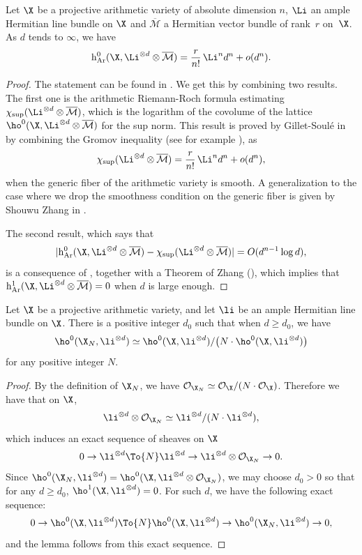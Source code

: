 \begin{thm}\label{hilbsamu}
Let $\X$ be a projective arithmetic variety of absolute dimension $n$, $\Li$ an ample Hermitian line bundle on $\X$ and $\overline{\mathcal{M}}$ a Hermitian vector bundle of rank~$r$ on~$\X$. As $d$ tends to $\infty$, we have
\[
\mathrm{h}^0_{\mathrm{Ar}}(\X,\Li^{\otimes d}\otimes \overline{\mathcal{M}})= \frac{r}{n!}\,\Li^{n} d^n+o(d^n).
\]
\end{thm}
\begin{proof}[Proof]
The statement can be found in \cite[Cor.\,2.7 (1)]{Yu08}. We get this by combining two results. The first one is the arithmetic Riemann-Roch formula esti\-ma\-ting $\chi_{\mathrm{sup}}(\Li^{\otimes d}\otimes \overline{\mathcal{M}})$, which is the logarithm of the covolume of the lattice \hbox{$\ho^0(\X, \Li^{\otimes d}\otimes \overline{\mathcal{M}})$} for the sup norm. This result is proved by Gillet-Soulé in \cite{GS92} by combining the Gromov inequality (see for example \cite[Cor.\,2.7 (2)]{Yu08}), as
\[
\chi_{\mathrm{sup}}(\Li^{\otimes d}\otimes \overline{\mathcal{M}})=\frac{r}{n!}\,\Li^{n} d^n+o(d^n),
\]
when the generic fiber of the arithmetic variety is smooth. A generalization to the case where we drop the smoothness condition on the generic fiber is given by Shouwu Zhang in \cite[Th.\,(1.4)]{Zh95}.

The second result, which says that
\[
|\mathrm{h}^0_{\mathrm{Ar}}(\X,\Li^{\otimes d}\otimes \overline{\mathcal{M}})-\chi_{\mathrm{sup}}(\Li^{\otimes d}\otimes \overline{\mathcal{M}})|
=O(d^{n-1}\log d),
\]
is a consequence of \cite[Th.\,2]{GS91}, together with a Theorem of Zhang (\cite[Th.\,4.2]{Zh95}), which implies that $\mathrm{h}^1_{\mathrm{Ar}}(\X,\Li^{\otimes d}\otimes \overline{\mathcal{M}})=0$ when $d$ is large enough.
\end{proof}

\label{arithample2}

\begin{lem}\label{freemod}
Let $\X$ be a projective arithmetic variety, and let $\li$ be an ample Hermitian line bundle on $\X$. There is a positive integer $d_0$ such that when $d\geq d_0$, we have
\[
\ho^0(\X_N,\li^{\otimes d})\simeq\ho^0(\X,\li^{\otimes d})/\big(N\cdot \ho^0(\X,\li^{\otimes d})\big)
\]
for any positive integer $N$.
\end{lem}
\begin{proof}[Proof]
By the definition of $\X_N$, we have $\mathcal{O}_{\X_N}\simeq \mathcal{O}_{\X}/(N\cdot \mathcal{O}_{\X})$. Therefore we have that on $\X$,
\[
\li^{\otimes d}\otimes \mathcal{O}_{\X_N}\simeq \li^{\otimes d}/(N\cdot \li^{\otimes d}),
\]
which induces an exact sequence of sheaves on $\X$
\[
0\to \li^{\otimes d}\To{N} \li^{\otimes d}\to \li^{\otimes d}\otimes \mathcal{O}_{\X_N}\to 0.
\]
Since $\ho^0(\X_N,\li^{\otimes d})=\ho^0(\X,\li^{\otimes d}\otimes \mathcal{O}_{\X_N})$, we may choose $d_0>0$ so that for any $d\geq d_0$, $\ho^1(\X,\li^{\otimes d})=0$. For such $d$, we have the following exact sequence:
\[
0\to \ho^0(\X,\li^{\otimes d})\To{N}\ho^0(\X,\li^{\otimes d})\to \ho^0(\X_N,\li^{\otimes d})\to 0,
\]
and the lemma follows from this exact sequence.
\end{proof}

